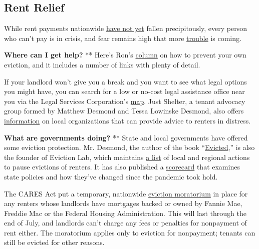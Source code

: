 \hypertarget{rent-relief}{%
\subsection{Rent Relief}\label{rent-relief}}

While rent payments nationwide
\href{https://www.nytimes.com/2020/05/31/business/economy/coronavirus-rent-landlords-tenants.html}{have
not yet} fallen precipitously, every person who can't pay is in crisis,
and fear remains high that more
\href{https://www.nytimes.com/2020/05/27/us/coronavirus-evictions-renters.html?action=click\&module=RelatedLinks\&pgtype=Article}{trouble}
is coming.

\textbf{Where can I get help?} ** Here's Ron's
\href{https://www.nytimes.com/2020/07/11/your-money/coronavirus-eviction-prevention-renters-landlord.html}{column}
on how to prevent your own eviction, and it includes a number of links
with plenty of detail.

If your landlord won't give you a break and you want to see what legal
options you might have, you can search for a low or no-cost legal
assistance office near you via the Legal Services Corporation's
\href{https://www.lsc.gov/what-legal-aid/find-legal-aid}{map}. Just
Shelter, a tenant advocacy group formed by Matthew Desmond and Tessa
Lowinske Desmond, also offers
\href{https://justshelter.org/community-resources/}{information} on
local organizations that can provide advice to renters in distress.

\textbf{What are governments doing?} ** State and local governments have
offered some eviction protection. Mr. Desmond, the author of the book
``\href{https://www.nytimes.com/2016/02/28/books/review/matthew-desmonds-evicted-poverty-and-profit-in-the-american-city.html}{Evicted},''
is also the founder of Eviction Lab, which maintains
\href{https://evictionlab.org/covid-eviction-policies/}{a list} of local
and regional actions to pause evictions of renters. It has also
published a
\href{https://evictionlab.org/covid-policy-scorecard/}{scorecard} that
examines state policies and how they've changed since the pandemic took
hold.

The CARES Act put a temporary, nationwide
\href{https://crsreports.congress.gov/product/pdf/IN/IN11320}{eviction
moratorium} in place for any renters whose landlords have mortgages
backed or owned by Fannie Mae, Freddie Mac or the Federal Housing
Administration. This will last through the end of July, and landlords
can't charge any fees or penalties for nonpayment of rent either. The
moratorium applies only to eviction for nonpayment; tenants can still be
evicted for other reasons.

